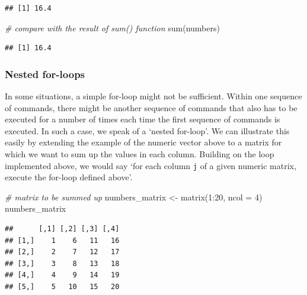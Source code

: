 \documentclass[
  12pt,
]{style/krantz}
\newenvironment{Shaded}{\begin{snugshade}}{\end{snugshade}}
\newcommand{\AttributeTok}[1]{\textcolor[rgb]{0.77,0.63,0.00}{#1}}
\newcommand{\CommentTok}[1]{\textcolor[rgb]{0.56,0.35,0.01}{\textit{#1}}}
\newcommand{\DecValTok}[1]{\textcolor[rgb]{0.00,0.00,0.81}{#1}}
\newcommand{\FunctionTok}[1]{\textcolor[rgb]{0.00,0.00,0.00}{#1}}
\newcommand{\NormalTok}[1]{#1}
\newcommand{\OtherTok}[1]{\textcolor[rgb]{0.56,0.35,0.01}{#1}}
\newcommand{\SpecialCharTok}[1]{\textcolor[rgb]{0.00,0.00,0.00}{#1}}
\begin{document}
\begin{verbatim}
## [1] 16.4
\end{verbatim}

\begin{Shaded}
\begin{Highlighting}[]
\CommentTok{\# compare with the result of sum() function}
\FunctionTok{sum}\NormalTok{(numbers)}
\end{Highlighting}
\end{Shaded}

\begin{verbatim}
## [1] 16.4
\end{verbatim}

\hypertarget{nested-for-loops}{%
\subsubsection{Nested for-loops}\label{nested-for-loops}}

In some situations, a simple for-loop might not be sufficient. Within one sequence of commands, there might be another sequence of commands that also has to be executed for a number of times each time the first sequence of commands is executed. In such a case, we speak of a `nested for-loop'. We can illustrate this easily by extending the example of the numeric vector above to a matrix for which we want to sum up the values in each column. Building on the loop implemented above, we would say `for each column \texttt{j} of a given numeric matrix, execute the for-loop defined above'.

\begin{Shaded}
\begin{Highlighting}[]
\CommentTok{\# matrix to be summed up}
\NormalTok{numbers\_matrix }\OtherTok{\textless{}{-}} \FunctionTok{matrix}\NormalTok{(}\DecValTok{1}\SpecialCharTok{:}\DecValTok{20}\NormalTok{, }\AttributeTok{ncol =} \DecValTok{4}\NormalTok{)}
\NormalTok{numbers\_matrix}
\end{Highlighting}
\end{Shaded}

\begin{verbatim}
##      [,1] [,2] [,3] [,4]
## [1,]    1    6   11   16
## [2,]    2    7   12   17
## [3,]    3    8   13   18
## [4,]    4    9   14   19
## [5,]    5   10   15   20
\end{verbatim}
\end{document}
